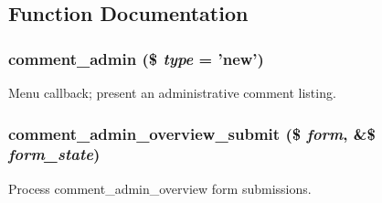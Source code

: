 \subsection{Function Documentation}
\hypertarget{comment_8admin_8inc_afe7a967aebd51b588b647caada9b506a}{
\subsubsection[{comment\_\-admin}]{\setlength{\rightskip}{0pt plus 5cm}comment\_\-admin (\$ {\em type} = {\ttfamily 'new'})}}
\label{comment_8admin_8inc_afe7a967aebd51b588b647caada9b506a}
Menu callback; present an administrative comment listing. \hypertarget{comment_8admin_8inc_ae242a86117c7b818ad449f42dd63706c}{
\subsubsection[{comment\_\-admin\_\-overview\_\-submit}]{\setlength{\rightskip}{0pt plus 5cm}comment\_\-admin\_\-overview\_\-submit (\$ {\em form}, \/  \&\$ {\em form\_\-state})}}
\label{comment_8admin_8inc_ae242a86117c7b818ad449f42dd63706c}
Process comment\_\-admin\_\-overview form submissions.

